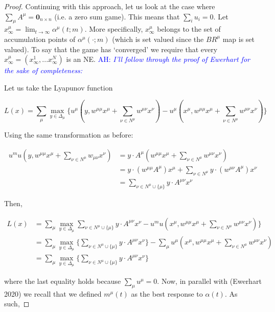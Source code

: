 \documentclass{article}
\theoremstyle{definition}
\newcommand{\ah}[1]{\textcolor{blue}{AH: \textit{#1}}}
\newcommand{\wmunu}{w^{\mu \nu}}
\newcommand{\xmu}{x^{\mu}}
\newcommand{\xnu}{x^{\nu}}
\begin{document}
\begin{proof}
		Continuing with this approach, let us look at the case where $\sum_\mu A^\mu = \textbf{0}_{n\times n}$ (i.e. a zero sum game). This means that $\sum_i u_i = 0$. Let $\xmu_\infty = \lim_{t \rightarrow \infty} \alpha^\mu(t; m)$. More specifically, $\xmu_\infty$ belongs to the set of accumulation points of $\alpha^\mu(\cdot; m)$ (which is set valued since the $BR^\mu$ map is set valued). To say that the game has `converged' we require that every $\xmu_\infty = (x^1_\infty, ... x^N_\infty)$ is an NE. \ah{I'll follow through the proof of Ewerhart for the sake of completeness: }
		
		Let us take the Lyapunov function
		
		\begin{equation}
			L(x) = \sum_\mu \max_{y \in \Delta_\mu} \{u^\mu(y, w^{\mu \mu} \xmu + \sum_{\nu \in N^\mu} \wmunu \xnu) - u^\mu(\xmu, w^{\mu \mu} \xmu + \sum_{\nu \in N^\mu} \wmunu \xnu) \}
		\end{equation}
		
		Using the same transformation as before:
		
		\begin{align}
			 u^mu(y, w^{\mu \mu} \xmu + \sum_{\nu \in N^\mu} w_{\mu \nu} \xnu) & =  y \cdot A^\mu (w^{\mu \mu} \xmu + \sum_{\nu \in N^\mu} \wmunu \xnu) \nonumber \\
			 & =  y \cdot (w^{\mu \mu} A^\mu) \xmu + \sum_{\nu \in N^\mu} y \cdot (\wmunu A^\mu) \xnu \nonumber \\
			  & =  \sum_{\nu \in N^\mu \cup \{\mu\}} y \cdot A^{\mu \nu} \xnu \nonumber 
		\end{align}
		
		Then,
		
		\begin{align}
		L(x) &= \sum_\mu \max_{y \in \Delta_\mu}\sum_{\nu \in N^\mu \cup \{\mu\}} y \cdot A^{\mu \nu} \xnu  - u^mu(\xmu, w^{\mu \mu} \xmu + \sum_{\nu \in N^\mu} w^{\mu \nu} \xnu) \} \nonumber \\
		&= \sum_\mu \max_{y \in \Delta_\mu} \{\sum_{\nu \in N^\mu \cup \{\mu\}} y \cdot A^{\mu \nu} \xnu  \} - \sum_\mu  u^\mu(\xmu, w^{\mu \mu} \xmu + \sum_{\nu \in N^\mu} w^{\mu \nu} \xnu) \nonumber \\
		&= \sum_\mu \max_{y \in \Delta_\mu} \{\sum_{\nu \in N^\mu \cup \{\mu\}} y \cdot A^{\mu \nu} \xnu  \} \nonumber 
		\end{align}
		
		where the last equality holds because $\sum_\mu u^\mu = 0$. Now, in parallel with (Ewerhart 2020) we recall that we defined $m^\mu(t)$ as the best response to $\alpha(t)$. As such,


\end{proof}
\end{document}
